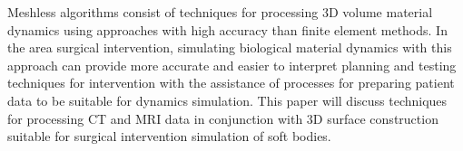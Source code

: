 \begin{comment}
Item
1
Background Information
Creates a clear picture of the field

Problem Statement
The problem is stated clearly and specifically
Intended Contribution
The intended contribution is stated clearly and specifically

Extent of Review
The review is extensive and focused

Structure of Review
The structure is logical and leads to the identified problem and proposed method of research

Appropriate Sources
The sources are scholarly and or professional

Explanation of Method
It is clear how the research will be carried out

Identification of Resources
All necessary resources have been identified and their requirement justified 

Timeline to Completion
The timeline is realistic and detailed

Quality of Writing 
The writing is excellent

Citations
All sources have been cited

Appropriate Length 
The length is appropriate (body of document 2000-3000 words)
\end{comment}

Meshless algorithms consist of techniques for processing 3D volume material dynamics using approaches with high accuracy than finite element methods. In the area surgical intervention, simulating biological material dynamics with this approach can provide more accurate and easier to interpret planning and testing techniques for intervention with the assistance of processes for preparing patient data to be suitable for dynamics simulation. This paper will discuss techniques for processing CT and MRI data in conjunction with 3D surface construction suitable for surgical intervention simulation of soft bodies.